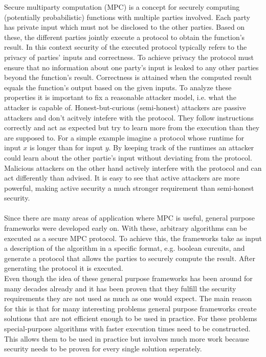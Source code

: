 Secure multiparty computation (MPC) is a concept for securely computing (potentially probabilistic) functions with multiple parties involved. Each party has private input which must not be disclosed to the other parties. Based on these, the different parties jointly execute a protocol to obtain the function's result. In this context security of the executed protocol typically refers to the privacy of parties' inputs and correctness. To achieve privacy the protocol must ensure that no information about one party's input is leaked to any other parties beyond the function's result. Correctness is attained when the computed result equals the function's output based on the given inputs. To analyze these properties it is important to fix a reasonable attacker model, i.e. what the attacker is capable of. Honest-but-curious (semi-honest) attackers are passive attackers and don't acitvely intefere with the protocol. They follow instructions correctly and act as expected but try to learn more from the execution than they are supposed to. For a simple example imagine a protocol whose runtime for input $x$ is longer than for input $y$. By keeping track of the runtimes an attacker could learn about the other partie's input without deviating from the protocol. Malicious attackers on the other hand actively interfere with the protocol and can act differently than advised. It is easy to see that active attackers are more powerful, making active security a much stronger requirement than semi-honest security.\\
\ \\Since there are many areas of application where MPC is useful, general purpose frameworks were developed early on. With these, arbitrary algorithms can be executed as a secure MPC protocol. To achieve this, the frameworks take as input a description of the algorithm in a specific format, e.g. boolean curcuits, and generate a protocol that allows the parties to securely compute the result. After generating the protocol it is executed.\\ 
Even though the idea of these general purpose frameworks has been around for many decades already and it has been proven that they fulfill the security requirements they are not used as much as one would expect. The main reason for this is that for many interesting problems general purpose frameworks create solutions that are not efficient enough to be used in practice.  For these problems special-purpose algorithms with faster execution times need to be constructed. This allows them to be used in practice but involves much more work because security needs to be proven for every single solution seperately. \\
